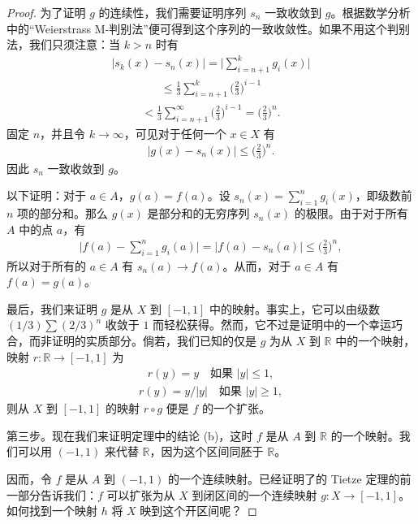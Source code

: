 \begin{proof}
为了证明 $g$ 的连续性，我们需要证明序列 $s_{n}$ 一致收敛到 $g$。根据数学分析中的``Weierstrass M-判别法''便可得到这个序列的一致收敛性。如果不用这个判别法，我们只须注意：当 $k>n$ 时有
\begin{align*}
|s_{k}(x)-s_{n}(x)|=\Big|\sum_{i=n+1}^{k}g_{i}(x)\Big|
\end{align*}
\begin{align*}
\leqslant\frac{1}{3}\sum_{i=n+1}^{k}\Big(\frac{2}{3}\Big)^{i-1}
\end{align*}
\begin{align*}
<\frac{1}{3}\sum_{i=n+1}^{\infty}\Big(\frac{2}{3}\Big)^{i-1}=\Big(\frac{2}{3}\Big)^{n}.
\end{align*}
固定 $n$，并且令 $k\to\infty$，可见对于任何一个 $x\in X$ 有
\begin{align*}
|g(x)-s_{n}(x)|\leqslant\Big(\frac{2}{3}\Big)^{n}.
\end{align*}
因此 $s_{n}$ 一致收敛到 $g$。

以下证明：对于 $a\in A$，$g(a)=f(a)$。设 $s_{n}(x)=\sum_{i=1}^{n}g_{i}(x)$，即级数前 $n$ 项的部分和。那么 $g(x)$ 是部分和的无穷序列 $s_{n}(x)$ 的极限。由于对于所有 $A$ 中的点 $a$，有
\begin{align*}
\Big|f(a)-\sum_{i=1}^{n}g_{i}(a)\Big|=|f(a)-s_{n}(a)|\leqslant\Big(\frac{2}{3}\Big)^{n},
\end{align*}
所以对于所有的 $a\in A$ 有 $s_{n}(a)\to f(a)$。从而，对于 $a\in A$ 有 $f(a)=g(a)$。

最后，我们来证明 $g$ 是从 $X$ 到 $[-1,1]$ 中的映射。事实上，它可以由级数 $(1/3)\sum(2/3)^{n}$ 收敛于 $1$ 而轻松获得。然而，它不过是证明中的一个幸运巧合，而非证明的实质部分。倘若，我们已知的仅是 $g$ 为从 $X$ 到 $\mathbb{R}$ 中的一个映射，映射 $r\colon\mathbb{R}\to[-1,1]$ 为
\begin{align*}
r(y)=y\quad\text{如果 }|y|\leqslant 1,
\end{align*}
\begin{align*}
r(y)=y/|y|\quad\text{如果 }|y|\geqslant 1,
\end{align*}
则从 $X$ 到 $[-1,1]$ 的映射 $r\circ g$ 便是 $f$ 的一个扩张。

第三步。现在我们来证明定理中的结论 (b)，这时 $f$ 是从 $A$ 到 $\mathbb{R}$ 的一个映射。我们可以用 $(-1,1)$ 来代替 $\mathbb{R}$，因为这个区间同胚于 $\mathbb{R}$。

因而，令 $f$ 是从 $A$ 到 $(-1,1)$ 的一个连续映射。已经证明了的 Tietze 定理的前一部分告诉我们：$f$ 可以扩张为从 $X$ 到闭区间的一个连续映射 $g\colon X\to[-1,1]$。如何找到一个映射 $h$ 将 $X$ 映到这个开区间呢？


\end{proof}
